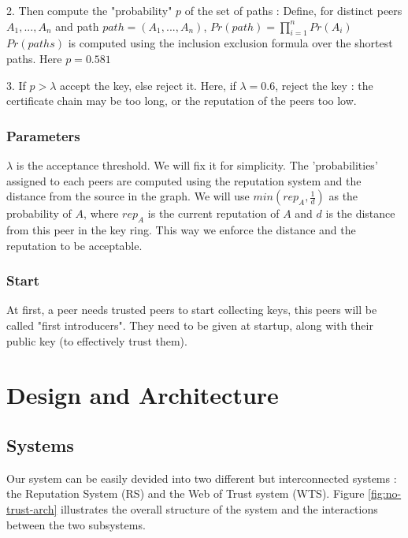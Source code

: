 \documentclass[]{article}
\begin{document}
        2. Then compute the "probability" $p$ of the set of paths : \newline
        Define, for distinct peers $A_1,...,A_n$ and path $path = (A_1,...,A_n)$, $Pr(path) = \prod_{i = 1}^{n} Pr(A_i)$ \newline
        $Pr(paths)$ is computed using the inclusion exclusion formula over the shortest paths. \newline
        Here $p = 0.581$
        
        3. If $p > \lambda$ accept the key, else reject it. \newline
        Here, if $\lambda = 0.6$, reject the key : the certificate chain may be too long, or the reputation of the peers too low.
        
        \subsubsection{Parameters}
        \label{sec:parameters}
        $\lambda$ is the acceptance threshold. We will fix it for simplicity. \newline
        The 'probabilities' assigned to each peers are computed using the reputation system and the distance from the source in the graph. We will use $min(rep_A, \frac{1}{d})$ as the probability of $A$, where $rep_A$ is the current reputation of $A$ and $d$ is the distance from this peer in the key ring. This way we enforce the distance and the reputation to be acceptable.
        
        \subsubsection{Start}
        At first, a peer needs trusted peers to start collecting keys, this peers will be called "first introducers". They need to be given at startup, along with their public key (to effectively trust them).
        
    \section{Design and Architecture}
        
        \subsection{Systems}
        Our system can be easily devided into two different but interconnected systems : the Reputation System (RS) and the Web of Trust system (WTS). \newline
        Figure \ref{fig:no-trust-arch} illustrates the overall structure of the system and the interactions between the two subsystems.
        
\end{document}
